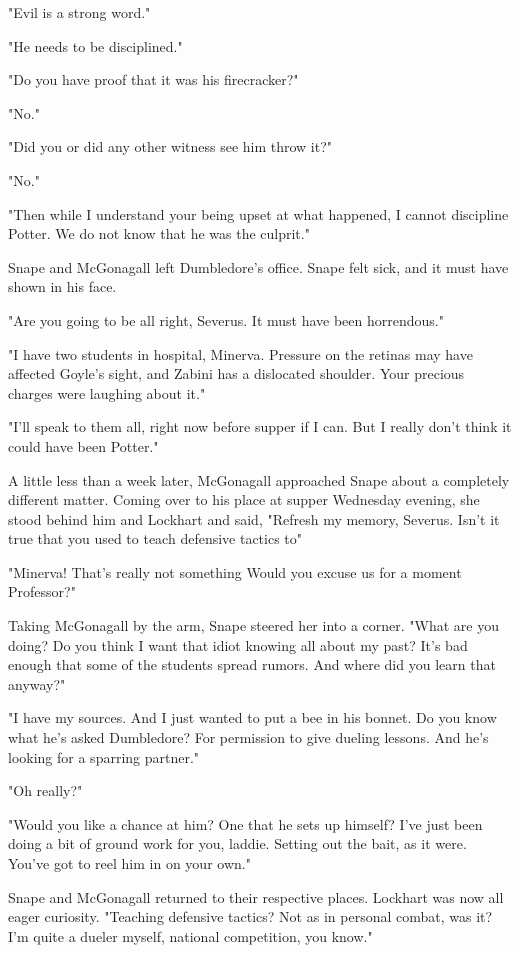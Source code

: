 "Evil is a strong word."

"He needs to be disciplined."

"Do you have proof that it was his firecracker?"

"No."

"Did you or did any other witness see him throw it?"

"No."

"Then while I understand your being upset at what happened, I cannot discipline Potter. We do not know that he was the culprit."

Snape and McGonagall left Dumbledore's office. Snape felt sick, and it must have shown in his face.

"Are you going to be all right, Severus. It must have been horrendous."

"I have two students in hospital, Minerva. Pressure on the retinas may have affected Goyle's sight, and Zabini has a dislocated shoulder. Your precious charges were laughing about it."

"I'll speak to them all, right now before supper if I can. But I really don't think it could have been Potter."

A little less than a week later, McGonagall approached Snape about a completely different matter. Coming over to his place at supper Wednesday evening, she stood behind him and Lockhart and said, "Refresh my memory, Severus. Isn't it true that you used to teach defensive tactics to{\el}"

"Minerva! That's really not something{\el} Would you excuse us for a moment Professor?"

Taking McGonagall by the arm, Snape steered her into a corner. "What are you doing? Do you think I want that idiot knowing all about my past? It's bad enough that some of the students spread rumors. And where did you learn that anyway?"

"I have my sources. And I just wanted to put a bee in his bonnet. Do you know what he's asked Dumbledore? For permission to give dueling lessons. And he's looking for a sparring partner."

"Oh really?"

"Would you like a chance at him? One that he sets up himself? I've just been doing a bit of ground work for you, laddie. Setting out the bait, as it were. You've got to reel him in on your own."

Snape and McGonagall returned to their respective places. Lockhart was now all eager curiosity. "Teaching defensive tactics? Not as in personal combat, was it? I'm quite a dueler myself, national competition, you know."

